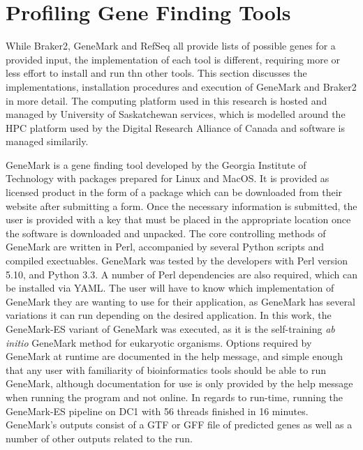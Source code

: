 \section{Profiling Gene Finding Tools}

While Braker2, GeneMark and RefSeq all provide lists of possible genes
for a provided input, the implementation of each tool is different,
requiring more or less effort to install and run thn other tools. This
section discusses the implementations, installation procedures and
execution of GeneMark and Braker2 in more detail. The computing
platform used in this research is hosted and managed by University of
Saskatchewan services, which is modelled around the HPC platform used
by the Digital Research Alliance of Canada and software is managed
similarily.

GeneMark\cite{10.1093/nar/gki937} is a gene finding tool developed by
the Georgia Institute of Technology with packages prepared for Linux
and MacOS. It is provided as licensed product in the form of a package
which can be downloaded from their website after submitting a
form. Once the necessary information is submitted, the user is
provided with a key that must be placed in the appropriate location
once the software is downloaded and unpacked. The core controlling
methods of GeneMark are written in Perl, accompanied by several Python
scripts and compiled exectuables. GeneMark was tested by the
developers with Perl version 5.10, and Python 3.3. A number of Perl
dependencies are also required, which can be installed via YAML. The
user will have to know which implementation of GeneMark they are
wanting to use for their application, as GeneMark has several
variations it can run depending on the desired application. In this
work, the GeneMark-ES variant of GeneMark was executed, as it is the
self-training \textit{ab initio} GeneMark method for eukaryotic
organisms. Options required by GeneMark at runtime are documented in
the help message, and simple enough that any user with familiarity of
bioinformatics tools should be able to run GeneMark, although
documentation for use is only provided by the help message when
running the program and not online. In regards to run-time, running
the GeneMark-ES pipeline on DC1 with 56 threads finished in 16
minutes. GeneMark's outputs consist of a GTF or GFF file of predicted
genes as well as a number of other outputs related to the run.

